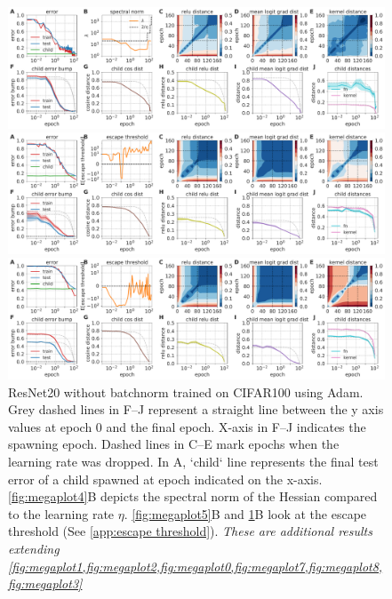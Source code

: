 \documentclass{article}
\begin{document}
\begin{figure}[t!]
    \centering
    \includegraphics[width=\linewidth]{figures/cifar10-wrn-bn-mom.pdf}
    \caption{WideResNet-16-4 trained on CIFAR10 using momentum. 
    }
    \label{fig:megaplot4}
    \centering
    \includegraphics[width=\linewidth]{figures/cifar10-resnet20-nobn-adam.pdf}
    \caption{ResNet20 without batchnorm trained on CIFAR10 using Adam. 
    }
    \label{fig:megaplot5}
%
%
    \centering
    \includegraphics[width=\linewidth]{figures/cifar100-resnet20-nobn-adam.pdf}
    \caption{ResNet20 without batchnorm trained on CIFAR100 using Adam. \newline Grey dashed lines in F--J represent a straight line between the y axis values at epoch 0 and the final epoch. X-axis in F--J indicates the spawning epoch.
    Dashed lines in C--E mark epochs when the learning rate was dropped.
    In A, `child` line represents the final test error of a child spawned at epoch indicated on the x-axis. \cref{fig:megaplot4}B depicts the spectral norm of the Hessian compared to the learning rate $\eta$. \cref{fig:megaplot5}B and \cref{fig:megaplot6}B look at the escape threshold (See \cref{app:escape threshold}).
    \emph{These are additional results extending \cref{fig:megaplot1,fig:megaplot2,fig:megaplot0,fig:megaplot7,fig:megaplot8,fig:megaplot3}}
    }
    \label{fig:megaplot6}
\end{figure}
%
\end{document}
